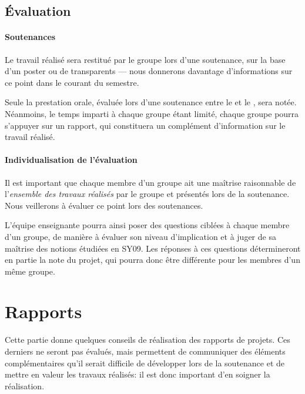 \documentclass[twocolumn,10pt]{article}
\begin{document}

\subsection{\'Evaluation}\label{subsec:proj:eval}

\paragraph{Soutenances}

Le travail réalisé sera restitué par le groupe lors d'une soutenance, sur la base d'un poster ou de transparents --- nous donnerons davantage d'informations sur ce point dans le courant du semestre. 

Seule la prestation orale, évaluée lors d'une soutenance entre le  et le , sera notée. Néanmoins, le temps imparti à chaque groupe étant limité, chaque groupe pourra s'appuyer sur un rapport, qui constituera un complément d'information sur le travail réalisé. 

\paragraph{Individualisation de l'évaluation}

Il est important que chaque membre d'un groupe ait une maîtrise raisonnable de l'\emph{ensemble des travaux réalisés} par le groupe et présentés lors de la soutenance. Nous veillerons à évaluer ce point lors des soutenances. 

L'équipe enseignante pourra ainsi poser des questions ciblées à chaque membre d'un groupe, de manière à évaluer son niveau d'implication et à juger de sa maîtrise des notions étudiées en SY09. Les réponses à ces questions détermineront en partie la note du projet, qui pourra donc être différente pour les membres d'un même groupe. 



\section{Rapports}\label{sec:CR}

Cette partie donne quelques conseils de réalisation des rapports de projets. Ces derniers ne seront pas évalués, mais permettent de communiquer des éléments complémentaires qu'il serait difficile de développer lors de la soutenance et de mettre en valeur les travaux réalisés: il est donc important d'en soigner la réalisation. 
\end{document}

